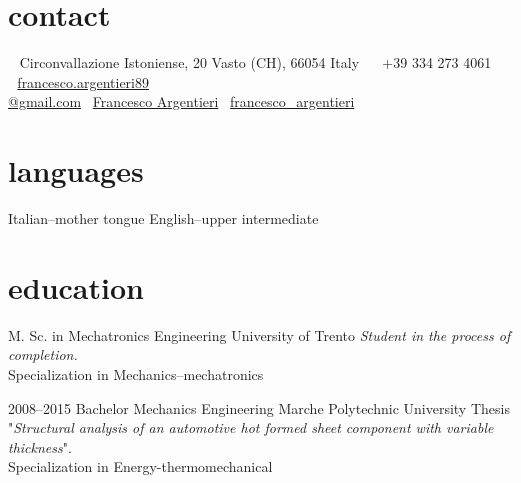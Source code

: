 \documentclass[]{friggeri-cv} %
\newcommand{\LinkedinColour}{{\color{linkedin} \faLinkedin}}
\newcommand{\Email}{{\color{black} \faEnvelope \,}}
\newcommand{\Skype}{{\color{skypeblue} \faSkype}}
\newcommand{\Phone}{{\color{phonegreen} \faPhone}}
\begin{document}


\begin{aside} %
\section{contact}
~
Circonvallazione Istoniense, 20
Vasto (CH), 66054
Italy
~
\Phone \, +39 334 273 4061
~
\Email \, \href{mailto:francesco.argentieri89@gmail.com}{francesco.argentieri89\\@gmail.com}
\LinkedinColour \, \href{https://it.linkedin.com/in/francesco-argentieri}{Francesco Argentieri}
\Skype \, \href{skype:my_username?add}{francesco\_argentieri}
\section{languages}
Italian--mother tongue
English--upper intermediate
\end{aside}


\section{education}

\begin{entrylist}


{M. Sc. {\normalfont in Mechatronics Engineering}}
{University of Trento}
{\emph{Student in the process of completion.}\\ Specialization in Mechanics--mechatronics}


\entry
{2008--2015}
{Bachelor {\normalfont Mechanics Engineering}}
{Marche Polytechnic University}
{Thesis "\emph{Structural analysis of an automotive hot formed sheet component with variable thickness}".\\
Specialization in Energy-thermomechanical}


\end{entrylist}
\end{document}
